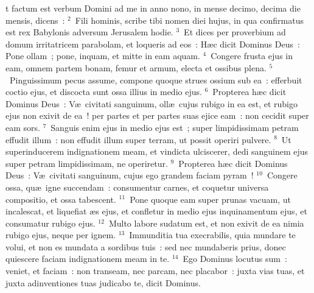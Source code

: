 \bchapter
{}t factum est verbum Domini ad me in anno nono, in mense decimo, decima die mensis, dicens~:
${}^{2}$~Fili hominis, scribe tibi nomen diei hujus, in qua confirmatus est rex Babylonis adversum Jerusalem hodie.
${}^{3}$~Et dices per proverbium ad domum irritatricem parabolam, et loqueris ad eos~: H\ae c dicit Dominus Deus~: Pone ollam~; pone, inquam, et mitte in eam aquam.
${}^{4}$~Congere frusta ejus in eam, omnem partem bonam, femur et armum, electa et ossibus plena.
${}^{5}$~Pinguissimum pecus assume, compone quoque strues ossium sub ea~: efferbuit coctio ejus, et discocta sunt ossa illius in medio ejus.
${}^{6}$~Propterea h\ae c dicit Dominus Deus~: V\ae\ civitati sanguinum, oll\ae\ cujus rubigo in ea est, et rubigo ejus non exivit de ea~! per partes et per partes suas ejice eam~: non cecidit super eam sors.
${}^{7}$~Sanguis enim ejus in medio ejus est~; super limpidissimam petram effudit illum~: non effudit illum super terram, ut possit operiri pulvere.
${}^{8}$~Ut superinducerem indignationem meam, et vindicta ulciscerer, dedi sanguinem ejus super petram limpidissimam, ne operiretur.
${}^{9}$~Propterea h\ae c dicit Dominus Deus~: V\ae\ civitati sanguinum, cujus ego grandem faciam pyram~!
${}^{10}$~Congere ossa, qu\ae\ igne succendam~: consumentur carnes, et coquetur universa compositio, et ossa tabescent.
${}^{11}$~Pone quoque eam super prunas vacuam, ut incalescat, et liquefiat \ae s ejus, et confletur in medio ejus inquinamentum ejus, et consumatur rubigo ejus.
${}^{12}$~Multo labore sudatum est, et non exivit de ea nimia rubigo ejus, neque per ignem.
${}^{13}$~Immunditia tua execrabilis, quia mundare te volui, et non es mundata a sordibus tuis~: sed nec mundaberis prius, donec quiescere faciam indignationem meam in te.
${}^{14}$~Ego Dominus locutus sum~: veniet, et faciam~: non transeam, nec parcam, nec placabor~: juxta vias tuas, et juxta adinventiones tuas judicabo te, dicit Dominus.


